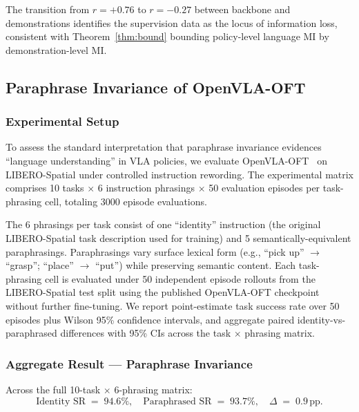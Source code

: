 The transition from $r = +0.76$ to $r = -0.27$ between backbone and demonstrations
identifies the supervision data as the locus of information loss, consistent with
Theorem~\ref{thm:bound} bounding policy-level language MI by demonstration-level MI.

\subsection{Paraphrase Invariance of OpenVLA-OFT}
\label{sec:results:paraphrase}

\subsubsection{Experimental Setup}
\label{sec:results:paraphrase:setup}

To assess the standard interpretation that paraphrase invariance evidences ``language
understanding'' in VLA policies, we evaluate OpenVLA-OFT~\cite{kim2025openvla_oft} on
LIBERO-Spatial under controlled instruction rewording. The experimental matrix comprises
10 tasks $\times$ 6 instruction phrasings $\times$ 50 evaluation episodes per
task-phrasing cell, totaling 3000 episode evaluations.

The 6 phrasings per task consist of one ``identity'' instruction (the original
LIBERO-Spatial task description used for training) and 5 semantically-equivalent
paraphrasings. Paraphrasings vary surface lexical form (e.g., ``pick up'' $\to$
``grasp''; ``place'' $\to$ ``put'') while preserving semantic content. Each task-phrasing
cell is evaluated under 50 independent episode rollouts from the LIBERO-Spatial test
split using the published OpenVLA-OFT checkpoint without further fine-tuning. We report
point-estimate task success rate over 50 episodes plus Wilson 95\% confidence intervals,
and aggregate paired identity-vs-paraphrased differences with 95\% CIs across the task
$\times$ phrasing matrix.

\subsubsection{Aggregate Result --- Paraphrase Invariance}
\label{sec:results:paraphrase:aggregate}

Across the full 10-task $\times$ 6-phrasing matrix:
\begin{equation}
\text{Identity SR} \;=\; 94.6\%, \quad \text{Paraphrased SR} \;=\; 93.7\%, \quad
\Delta \;=\; 0.9\,\text{pp}.
\label{eq:paraphrase_aggregate}
\end{equation}

